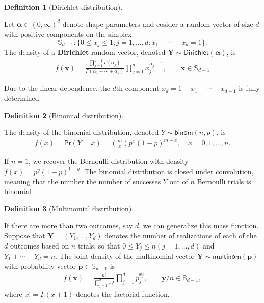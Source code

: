 \documentclass[
  11pt,
  letterpaper,
]{scrbook}
\theoremstyle{definition}
\theoremstyle{plain}
\theoremstyle{plain}
\theoremstyle{definition}
\theoremstyle{definition}
\newtheorem{definition}{Definition}[chapter]
\theoremstyle{remark}
\begin{document}
\begin{definition}[Dirichlet
distribution]\protect\hypertarget{def-dirichlet-dist}{}\label{def-dirichlet-dist}

Let \(\boldsymbol{\alpha} \in (0, \infty)^d\) denote shape parameters
and cosider a random vector of size \(d\) with positive components on
the simplex
\[\mathbb{S}_{d-1}: \{ 0 \leq x_j \leq 1; j=1, \ldots, d: x_1 + \cdots + x_d=1\}.\]
The density of a \textbf{Dirichlet} random vector, denoted
\(\boldsymbol{Y} \sim \mathsf{Dirichlet}(\boldsymbol{\alpha})\), is
\begin{align*}
f(\boldsymbol{x}) = \frac{\prod_{j=1}^{d-1}\Gamma(\alpha_j)}{\Gamma(\alpha_1 + \cdots + \alpha_d)}\prod_{j=1}^{d} x_j^{\alpha_j-1}, \qquad \boldsymbol{x} \in \mathbb{S}_{d-1}
\end{align*}

Due to the linear dependence, the \(d\)th component
\(x_d = 1- x_1 - \cdots - x_{d-1}\) is fully determined.

\end{definition}

\begin{definition}[Binomial
distribution]\protect\hypertarget{def-binomial}{}\label{def-binomial}

The density of the binomial distribution, denoted
\(Y \sim \mathsf{binom}(n, p)\), is \begin{align*}
f(x) = \mathsf{Pr}(Y=x) = \binom{m}{x}p^x (1-p)^{m-x}, \quad x=0, 1, \ldots, n.
\end{align*}

If \(n=1\), we recover the Bernoulli distribution with density
\(f(x) = p^{y}(1-p)^{1-y}\). The binomial distribution is closed under
convolution, meaning that the number the number of successes \(Y\) out
of \(n\) Bernoulli trials is binomial

\end{definition}

\begin{definition}[Multinomial
distribution]\protect\hypertarget{def-multinom-dist}{}\label{def-multinom-dist}

If there are more than two outcomes, say \(d\), we can generalize this
mass function. Suppose that \(\boldsymbol{Y}=(Y_1, \ldots, Y_d)\)
denotes the number of realizations of each of the \(d\) outcomes based
on \(n\) trials, so that \(0 \leq Y_j \leq n (j=1, \ldots, d)\) and
\(Y_1 + \cdots + Y_d=n\). The joint density of the multinomial vector
\(\boldsymbol{Y} \sim \mathsf{multinom}(\boldsymbol{p})\) with
probability vector \(\boldsymbol{p} \in \mathbb{S}_{d-1}\) is
\begin{align*}
f(\boldsymbol{x}) = \frac{n!}{\prod_{j=1}^d x_j!} \prod_{j=1}^d p_j^{x_j}, \qquad \boldsymbol{y}/n \in \mathbb{S}_{d-1},
\end{align*} where \(x! = \Gamma(x+1)\) denotes the factorial function.

\end{definition}
\end{document}

